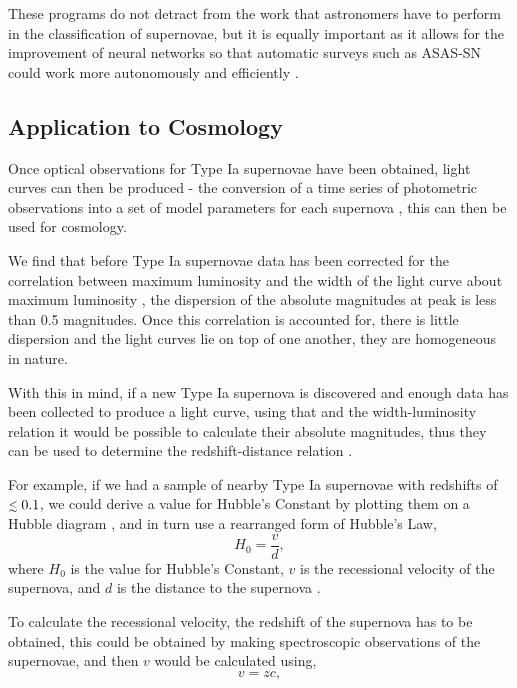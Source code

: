 \documentclass[twocolumn]{revtex4}
\begin{document}
These programs do not detract from the work that astronomers have to perform in the classification of supernovae, but it is equally important as it allows for the improvement of neural networks so that automatic surveys such as ASAS-SN could work more autonomously and efficiently \cite{cit-sci}.  

\vspace{-3ex}
\subsection{Application to Cosmology} \label{appcosmo}
\vspace{-2ex}
Once optical observations for Type Ia supernovae have been obtained, light curves can then be produced - the conversion of a time series of photometric observations into a set of model parameters for each supernova \cite{sn_consts}, this can then be used for cosmology. 

We find that before Type Ia supernovae data has been corrected for the correlation between maximum luminosity and the width of the light curve about maximum luminosity \cite{longair, abs_phil}, the dispersion of the absolute magnitudes at peak is less than 0.5 magnitudes. Once this correlation is accounted for, there is little dispersion and the light curves lie on top of one another, they are homogeneous in nature. 

With this in mind, if a new Type Ia supernova is discovered and enough data has been collected to produce a light curve, using that and the width-luminosity relation it would be possible to calculate their absolute magnitudes, thus they can be used to determine the redshift-distance relation \cite{mod_ast}.

For example, if we had a sample of nearby Type Ia supernovae with redshifts of $\mathrel{\mathsmaller{\lesssim}} 0.1$, we could derive a value for Hubble's Constant by plotting them on a Hubble diagram \cite{exp_uni_sn}, and in turn use a rearranged form of Hubble's Law,
\begin{equation}
H_0 = \frac{v}{d}, 
\label{h_nought}
\end{equation}
where $H_0$ is the value for Hubble's Constant, $v$ is the recessional velocity of the supernova, and $d$ is the distance to the supernova \cite{mod_ast}. 

To calculate the recessional velocity, the redshift of the supernova has to be obtained, this could be obtained by making spectroscopic observations of the supernovae, and then $v$ would be calculated using,
 \begin{equation}
v = zc,
\label{redshift}
\end{equation}
\end{document}
